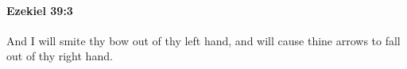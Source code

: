 
		\paragraph{Ezekiel 39:3} %
			\label{EZEKIEL-39-3}

			And I will smite thy bow out of thy left hand, and will cause thine arrows to fall out of thy right hand.



